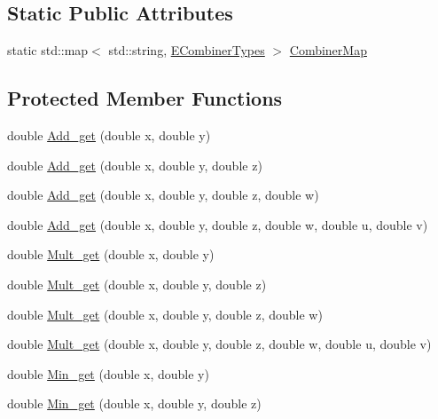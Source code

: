 \subsection*{Static Public Attributes}
\begin{DoxyCompactItemize}
\item 
static std::map$<$ std::string, \hyperlink{namespaceanl_af939b7c1f8bc368d125e0b103cb4f363}{ECombinerTypes} $>$ \hyperlink{classanl_1_1CImplicitCombiner_abedfc241ba96af092ef7b757a21b54c8}{CombinerMap}
\end{DoxyCompactItemize}
\subsection*{Protected Member Functions}
\begin{DoxyCompactItemize}
\item 
double \hyperlink{classanl_1_1CImplicitCombiner_a226d15de3528d906080a7ab7baeaf32c}{Add\_\-get} (double x, double y)
\item 
double \hyperlink{classanl_1_1CImplicitCombiner_a2becb9262b88f3a978097dd35d2e39b8}{Add\_\-get} (double x, double y, double z)
\item 
double \hyperlink{classanl_1_1CImplicitCombiner_ab6d3f553b52494d2de3a7ae187c8e720}{Add\_\-get} (double x, double y, double z, double w)
\item 
double \hyperlink{classanl_1_1CImplicitCombiner_a67b6275bd5fb2bce182b1ea8afe3be9e}{Add\_\-get} (double x, double y, double z, double w, double u, double v)
\item 
double \hyperlink{classanl_1_1CImplicitCombiner_adc188109266c7c9efe97615eec938faf}{Mult\_\-get} (double x, double y)
\item 
double \hyperlink{classanl_1_1CImplicitCombiner_ae2e84d5ea862a45c0512ee86f51e9ead}{Mult\_\-get} (double x, double y, double z)
\item 
double \hyperlink{classanl_1_1CImplicitCombiner_aa0b40bbb660865e5f18aa82736c7d2d1}{Mult\_\-get} (double x, double y, double z, double w)
\item 
double \hyperlink{classanl_1_1CImplicitCombiner_ac3b7afae5a29d790331deae8930fcf85}{Mult\_\-get} (double x, double y, double z, double w, double u, double v)
\item 
double \hyperlink{classanl_1_1CImplicitCombiner_a3a3a88babf1d5ba01971a2314b31ec2e}{Min\_\-get} (double x, double y)
\item 
double \hyperlink{classanl_1_1CImplicitCombiner_a59600499e680365658c78057ddc9be8a}{Min\_\-get} (double x, double y, double z)

\end{DoxyCompactItemize}
